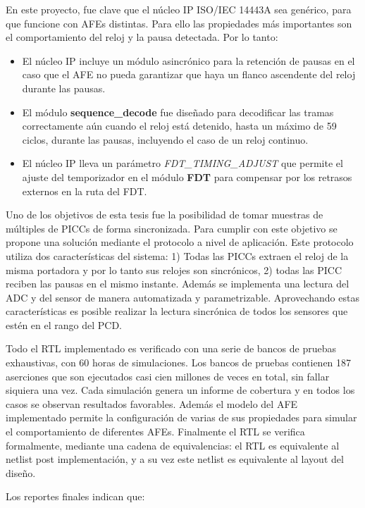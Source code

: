 \documentclass[a4paper, twoside, 11pt]{report}
\begin{document}
En este proyecto, fue clave que el núcleo IP ISO/IEC 14443A sea genérico, para que funcione con AFEs distintas. Para ello las propiedades más importantes son el comportamiento del reloj y la pausa detectada. Por lo tanto:

\begin{itemize}
  \item El núcleo IP incluye un módulo asincrónico para la retención de pausas en el caso que el AFE no pueda garantizar que haya un flanco ascendente del reloj durante las pausas.
  \item El módulo \textbf{sequence\_decode} fue diseñado para decodificar las tramas correctamente aún cuando el reloj está detenido, hasta un máximo de 59 ciclos, durante las pausas, incluyendo el caso de un reloj continuo.
  \item El núcleo IP lleva un parámetro \textit{FDT\_TIMING\_ADJUST} que permite el ajuste del temporizador en el módulo \textbf{FDT} para compensar por los retrasos externos en la ruta del FDT.
\end{itemize}

Uno de los objetivos de esta tesis fue la posibilidad de tomar muestras de múltiples de PICCs de forma sincronizada. Para cumplir con este objetivo se propone una solución mediante el protocolo a nivel de aplicación. Este protocolo utiliza dos características del sistema: 1) Todas las PICCs extraen el reloj de la misma portadora y por lo tanto sus relojes son sincrónicos, 2) todas las PICC reciben las pausas en el mismo instante. Además se implementa una lectura del ADC y del sensor de manera automatizada y parametrizable. Aprovechando estas características es posible realizar la lectura sincrónica de todos los sensores que estén en el rango del PCD.

Todo el RTL implementado es verificado con una serie de bancos de pruebas exhaustivas, con 60 horas de simulaciones. Los bancos de pruebas contienen 187 aserciones que son ejecutados casi cien millones de veces en total, sin fallar siquiera una vez. Cada simulación genera un informe de cobertura y en todos los casos se observan resultados favorables. Además el modelo del AFE implementado permite la configuración de varias de sus propiedades para simular el comportamiento de diferentes AFEs. Finalmente el RTL se verifica formalmente, mediante una cadena de equivalencias: el RTL es equivalente al netlist post implementación, y a su vez este netlist es equivalente al layout del diseño.

Los reportes finales indican que:
\end{document}
